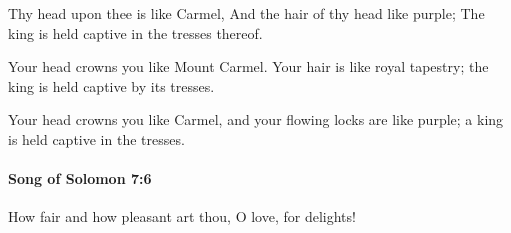 			\begin{versebox}
					\item[BHS] 
					\item[LXX] 
					\item[ASV] Thy head upon thee is like Carmel, And the hair of thy head like purple; The king is held captive in the tresses thereof.
					\item[NIV] Your head crowns you like Mount Carmel. Your hair is like royal tapestry; the king is held captive by its tresses.
					\item[NRSV] Your head crowns you like Carmel, and your flowing locks are like purple; a king is held captive in the tresses.
			\end{versebox}

		\paragraph{Song of Solomon 7:6} %
			\label{SONGOFSOLOMON-7-6}

			How fair and how pleasant art thou, O love, for delights!

